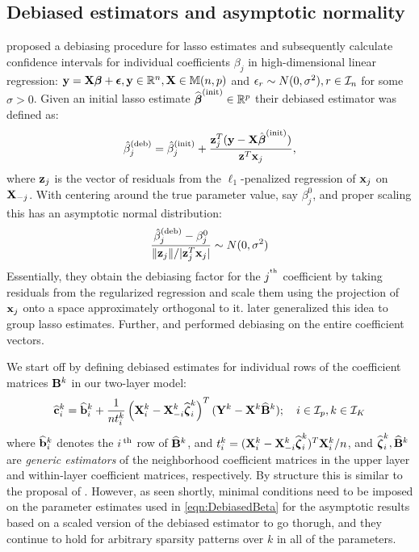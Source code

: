 \subsection{Debiased estimators and asymptotic normality}
\label{sec:testing-subsec-1}
\citet{ZhangZhang14} proposed a debiasing procedure for lasso estimates and subsequently calculate confidence intervals for individual coefficients $\beta_j$ in high-dimensional linear regression: ${\bf{y}} = {\mathbf{X}} {\boldsymbol{\beta}} + {\boldsymbol{\epsilon}}, {\bf{y}} \in {\mathbb{R}}^n, {\mathbf{X}} \in {\mathbb{M}}(n,p)$ and $\epsilon_r \sim N(0,\sigma^2), r \in {\cal{I}}_n$ for some $\sigma>0$. Given an initial lasso estimate $\widehat {{\boldsymbol{\beta}}}^{\text{(init)}} \in {\mathbb{R}}^p$ their debiased estimator was defined as:
%
$$
\hat \beta_j^{(\text{deb})} = \hat \beta_j^{(\text{init})} + \frac{{\bf{z}}_j^T ( {\bf{y}} - {\mathbf{X}} \hat {{\boldsymbol{\beta}}}^{(\text{init})})}{{\bf{z}}^T {\bf{x}}_j},
$$
%
where ${\bf{z}}_j$ is the vector of residuals from the $\ell_1$-penalized regression of ${\bf{x}}_j$ on ${\mathbf{X}}_{-j}$. With centering around the true parameter value, say $\beta_j^0$, and proper scaling this has an asymptotic normal distribution:
%
$$
\frac{\hat \beta_j^{(\text{deb})} - \beta_j^0}{\| {\bf{z}}_j \|/| {\bf{z}}_j^T {\bf{x}}_j |} \sim N(0, \sigma^2)
$$
%
Essentially, they obtain the debiasing factor for the $j^{\operatorname*{^{\text{th}}}}$ coefficient by taking residuals from the regularized regression and scale them using the projection of ${\bf{x}}_j$ onto a space approximately orthogonal to it. \citet{MitraZhang16} later generalized this idea to group lasso estimates. Further, \citet{vanDeGeerEtal14} and \citet{JavanmardMontanari14} performed debiasing on the entire coefficient vectors.

We start off by defining debiased estimates for individual rows of the coefficient matrices ${\mathbf{B}}^k$ in our two-layer model:
%
\begin{align}\label{eqn:DebiasedBeta}
\widehat {{\bf{c}}}_i^k = \widehat {{\bf{b}}}_i^k + \frac{1}{n t_i^k} \left( {\mathbf{X}}_i^k - {\mathbf{X}}_{-i}^k \widehat {{\boldsymbol{\zeta}}}_i^k \right)^T ({\mathbf{Y}}^k - {\mathbf{X}}^k \widehat {{\mathbf{B}}}^k )
; \quad i \in {\cal{I}}_p, k \in {\cal{I}}_K
\end{align}
%
where $\widehat {{\bf{b}}}_i^k$ denotes the $i\operatorname*{^{\text{th}}}$ row of $\widehat {{\mathbf{B}}}^k$, and $t_i^k = ( {\mathbf{X}}_i^k - {\mathbf{X}}_{-i}^k \widehat {{\boldsymbol{\zeta}}}_i^k )^T {\mathbf{X}}_{i}^k/n$, and $\widehat {{\boldsymbol{\zeta}}}_i^k, \widehat {{\mathbf{B}}}^k$ are {\it generic estimators} of the neighborhood coefficient matrices in the upper layer and within-layer coefficient matrices, respectively. By structure this is similar to the proposal of \citet{ZhangZhang14}. However, as seen shortly, minimal conditions need to be imposed on the parameter estimates used in \eqref{eqn:DebiasedBeta} for the asymptotic results based on a scaled version of the debiased estimator to go thorugh, and they continue to hold for arbitrary sparsity patterns over $k$ in all of the parameters.

